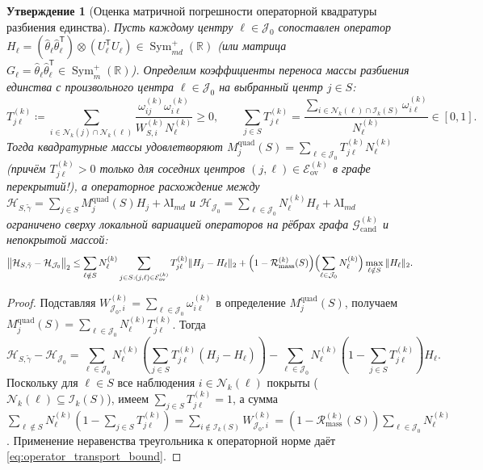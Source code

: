 \documentclass[11pt,a4paper]{article}
\newcommand{\R}{\mathbb{R}}
\newcommand{\Id}{\mathrm{I}}
\newcommand{\T}{^{\mathsf{T}}}
\newcommand{\II}{\mathcal{I}}
\newcommand{\JJJ}{\mathcal{J}}
\newtheorem{proposition}[theorem]{Утверждение}
\theoremstyle{definition}
\theoremstyle{remark}
\begin{document}
\begin{proposition}[Оценка матричной погрешности операторной квадратуры разбиения единства]\label{prop:operator_quad_error}
Пусть каждому центру $\ell \in \JJJ_0$ сопоставлен оператор $H_\ell = (\hat{\theta}_\ell \hat{\theta}_\ell\T) \otimes (U_\ell\T U_\ell) \in \operatorname{Sym}_{md}^+(\R)$ (или матрица $G_\ell = \hat{\theta}_\ell \hat{\theta}_\ell\T \in \operatorname{Sym}_m^+(\R)$). Определим коэффициенты переноса массы разбиения единства с произвольного центра $\ell \in \JJJ_0$ на выбранный центр $j \in S$:
\begin{equation}\label{eq:transport_Tjl}
    T_{j\ell}^{(k)} \coloneqq \sum_{i \in \mathcal{N}_k(j) \cap \mathcal{N}_k(\ell)} \frac{\omega_{ij}^{(k)} \omega_{i\ell}^{(k)}}{W_{S, i}^{(k)} N_\ell^{(k)}} \ge 0, \qquad \sum_{j \in S} T_{j\ell}^{(k)} = \frac{\sum_{i \in \mathcal{N}_k(\ell) \cap \II_k(S)} \omega_{i\ell}^{(k)}}{N_\ell^{(k)}} \in [0, 1].
\end{equation}
Тогда квадратурные массы удовлетворяют $M_j^{\mathrm{quad}}(S) = \sum_{\ell \in \JJJ_0} T_{j\ell}^{(k)} N_\ell^{(k)}$ (причём $T_{j\ell}^{(k)} > 0$ только для соседних центров $(j,\ell) \in \mathcal{E}_{\mathrm{ov}}^{(k)}$ в графе перекрытий!), а операторное расхождение между $\mathcal{H}_{S,\tilde{\gamma}} = \sum_{j \in S} M_j^{\mathrm{quad}}(S) H_j + \lambda \Id_{md}$ и $\mathcal{H}_{\JJJ_0} = \sum_{\ell \in \JJJ_0} N_\ell^{(k)} H_\ell + \lambda \Id_{md}$ ограничено сверху локальной вариацией операторов на рёбрах графа $\mathcal{G}_{\mathrm{cand}}^{(k)}$ и непокрытой массой:
\begin{equation}\label{eq:operator_transport_bound}
    \bigl\|\mathcal{H}_{S,\tilde{\gamma}} - \mathcal{H}_{\JJJ_0}\bigr\|_2 \le \sum_{\ell \notin S} N_\ell^{(k)} \sum_{j \in S : (j,\ell) \in \mathcal{E}_{\mathrm{ov}}^{(k)}} T_{j\ell}^{(k)} \|H_j - H_\ell\|_2 + \Bigl(1 - \mathcal{R}_{\mathrm{mass}}^{(k)}(S)\Bigr)\Bigl(\sum_{\ell \in \JJJ_0} N_\ell^{(k)}\Bigr) \max_{\ell \notin S}\|H_\ell\|_2.
\end{equation}
\end{proposition}
\begin{proof}
Подставляя $W_{\JJJ_0, i}^{(k)} = \sum_{\ell \in \JJJ_0}\omega_{i\ell}^{(k)}$ в определение $M_j^{\mathrm{quad}}(S)$, получаем $M_j^{\mathrm{quad}}(S) = \sum_{\ell \in \JJJ_0} N_\ell^{(k)} T_{j\ell}^{(k)}$. Тогда
\[
    \mathcal{H}_{S,\tilde{\gamma}} - \mathcal{H}_{\JJJ_0} = \sum_{\ell \in \JJJ_0} N_\ell^{(k)} \left(\sum_{j \in S} T_{j\ell}^{(k)} (H_j - H_\ell)\right) - \sum_{\ell \in \JJJ_0} N_\ell^{(k)} \left(1 - \sum_{j \in S} T_{j\ell}^{(k)}\right) H_\ell.
\]
Поскольку для $\ell \in S$ все наблюдения $i \in \mathcal{N}_k(\ell)$ покрыты ($\mathcal{N}_k(\ell) \subseteq \II_k(S)$), имеем $\sum_{j \in S} T_{j\ell}^{(k)} = 1$, а сумма $\sum_{\ell \notin S} N_\ell^{(k)}(1 - \sum_{j \in S} T_{j\ell}^{(k)}) = \sum_{i \notin \II_k(S)} W_{\JJJ_0, i}^{(k)} = (1 - \mathcal{R}_{\mathrm{mass}}^{(k)}(S))\sum_{\ell \in \JJJ_0} N_\ell^{(k)}$. Применение неравенства треугольника к операторной норме даёт \eqref{eq:operator_transport_bound}.
\end{proof}
\end{document}

